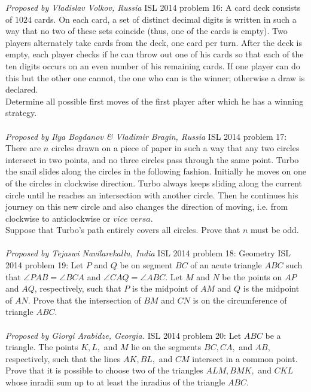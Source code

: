 \textit{Proposed by Vladislav Volkov, Russia} 
ISL 2014 problem 16:  A card deck consists of $1024$ cards. On each card, a set of distinct decimal digits is written in such a way that no two of these sets coincide (thus, one of the cards is empty). Two players alternately take cards from the deck, one card per turn. After the deck is empty, each player checks if he can throw out one of his cards so that each of the ten digits occurs on an even number of his remaining cards. If one player can do this but the other one cannot, the one who can is the winner; otherwise a draw is declared. \\
Determine all possible first moves of the first player after which he has a winning strategy. \\\\
\textit{Proposed by Ilya Bogdanov \& Vladimir Bragin, Russia} 
ISL 2014 problem 17:  There are $n$ circles drawn on a piece of paper in such a way that any two circles intersect in two points, and no three circles pass through the same point. Turbo the snail slides along the circles in the following fashion. Initially he moves on one of the circles in clockwise direction. Turbo always keeps sliding along the current circle until he reaches an intersection with another circle. Then he continues his journey on this new circle and also changes the direction of moving, i.e. from clockwise to anticlockwise or $\textit{vice versa}$. \\
Suppose that Turbo’s path entirely covers all circles. Prove that $n$ must be odd. \\\\
\textit{Proposed by Tejaswi Navilarekallu, India} 
ISL 2014 problem 18:  Geometry 
ISL 2014 problem 19:  Let $P$ and $Q$ be on segment $BC$ of an acute triangle $ABC$ such that $\angle PAB=\angle BCA$ and $\angle CAQ=\angle ABC$. Let $M$ and $N$ be the points on $AP$ and $AQ$, respectively, such that $P$ is the midpoint of $AM$ and $Q$ is the midpoint of $AN$. Prove that the intersection of $BM$ and $CN$ is on the circumference of triangle $ABC$. \\\\
\textit{Proposed by Giorgi Arabidze, Georgia.} 
ISL 2014 problem 20:  Let $ABC$ be a triangle. The points $K, L,$ and $M$ lie on the segments $BC, CA,$ and $AB,$ respectively, such that the lines $AK, BL,$ and $CM$ intersect in a common point. Prove that it is possible to choose two of the triangles $ALM, BMK,$ and $CKL$ whose inradii sum up to at least the inradius of the triangle $ABC$. \\\\
